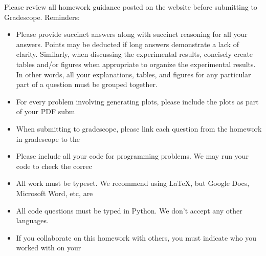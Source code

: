 \noindent Please review all homework guidance posted on the website before
submitting to Gradescope.  Reminders:
\begin{itemize}
  \item Please provide succinct answers along with
succinct reasoning for all your answers. Points may be deducted if
long answers demonstrate a lack of clarity. Similarly, when discussing
the experimental results, concisely create tables and/or figures when
appropriate to organize the experimental results. In other words, all
your explanations, tables, and figures for any particular part of a
question must be grouped together.
\item For every problem involving generating plots, please include the plots as part of your PDF subm
\item When submitting to gradescope, please link each question from the homework in gradescope to the
\item Please include all your code for programming problems. We may run your code to check the correc
\item All work must be typeset. We recommend using \LaTeX, but Google Docs, Microsoft Word, etc, are
\item All code questions must be typed in Python. We don't accept any other languages.
\item If you collaborate on this homework with others, you must indicate who you worked with on your
\end{itemize}
